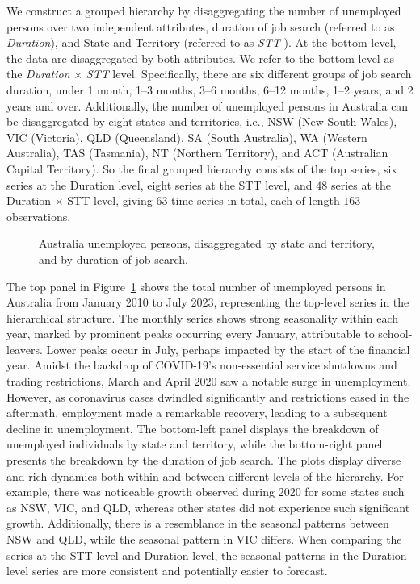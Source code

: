 \documentclass[
  11pt]{article}
\theoremstyle{plain}
\theoremstyle{remark}
\begin{document}
We construct a grouped hierarchy by disaggregating the number of
unemployed persons over two independent attributes, duration of job
search (referred to as \emph{Duration}), and State and Territory
(referred to as \emph{STT} ). At the bottom level, the data are
disaggregated by both attributes. We refer to the bottom level as the
\emph{Duration} \(\times\) \emph{STT} level. Specifically, there are six
different groups of job search duration, under 1 month, 1--3 months,
3--6 months, 6--12 months, 1--2 years, and 2 years and over.
Additionally, the number of unemployed persons in Australia can be
disaggregated by eight states and territories, i.e., NSW (New South
Wales), VIC (Victoria), QLD (Queensland), SA (South Australia), WA
(Western Australia), TAS (Tasmania), NT (Northern Territory), and ACT
(Australian Capital Territory). So the final grouped hierarchy consists
of the top series, six series at the Duration level, eight series at the
STT level, and \(48\) series at the Duration \(\times\) STT level,
giving \(63\) time series in total, each of length \(163\) observations.

\begin{figure}[!t]


\caption{\label{fig-labour-data}Australia unemployed persons,
disaggregated by state and territory, and by duration of job search.}

\end{figure}%

The top panel in Figure~\ref{fig-labour-data} shows the total number of
unemployed persons in Australia from January 2010 to July 2023,
representing the top-level series in the hierarchical structure. The
monthly series shows strong seasonality within each year, marked by
prominent peaks occurring every January, attributable to school-leavers.
Lower peaks occur in July, perhaps impacted by the start of the
financial year. Amidst the backdrop of COVID-19's non-essential service
shutdowns and trading restrictions, March and April 2020 saw a notable
surge in unemployment. However, as coronavirus cases dwindled
significantly and restrictions eased in the aftermath, employment made a
remarkable recovery, leading to a subsequent decline in unemployment.
The bottom-left panel displays the breakdown of unemployed individuals
by state and territory, while the bottom-right panel presents the
breakdown by the duration of job search. The plots display diverse and
rich dynamics both within and between different levels of the hierarchy.
For example, there was noticeable growth observed during 2020 for some
states such as NSW, VIC, and QLD, whereas other states did not
experience such significant growth. Additionally, there is a resemblance
in the seasonal patterns between NSW and QLD, while the seasonal pattern
in VIC differs. When comparing the series at the STT level and Duration
level, the seasonal patterns in the Duration-level series are more
consistent and potentially easier to forecast.
\end{document}
